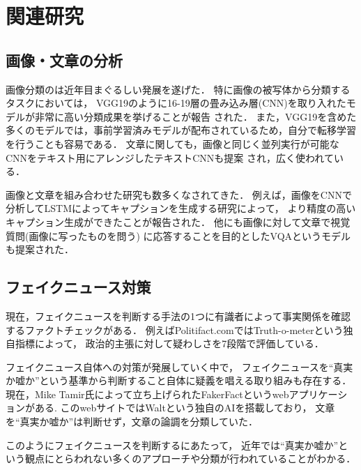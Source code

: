 \section{関連研究}
\subsection{画像・文章の分析}
画像分類のは近年目まぐるしい発展を遂げた．
特に画像の被写体から分類するタスクにおいては，
VGG19のように16-19層の畳み込み層(CNN)を取り入れたモデルが非常に高い分類成果を挙げることが報告
\cite{DBLP:journals/corr/SimonyanZ14a}された．
また，VGG19を含めた多くのモデルでは，事前学習済みモデルが配布されているため，自分で転移学習を行うことも容易である．
文章に関しても，画像と同じく並列実行が可能なCNNをテキスト用にアレンジしたテキストCNNも提案
\cite{DBLP:journals/corr/Kim14f}され，広く使われている．

画像と文章を組み合わせた研究も数多くなされてきた．
例えば，画像をCNNで分析してLSTMによってキャプションを生成する研究\cite{7298935}によって，
より精度の高いキャプション生成ができたことが報告された．
他にも画像に対して文章で視覚質問(画像に写ったものを問う)
に応答することを目的としたVQA\cite{7410636}というモデルも提案された．

\subsection{フェイクニュース対策}
現在，フェイクニュースを判断する手法の1つに有識者によって事実関係を確認するファクトチェックがある．
例えばPolitifact.comではTruth-o-meterという独自指標によって，
政治的主張に対して疑わしさを7段階で評価\cite{holan_2018}している．

フェイクニュース自体への対策が発展していく中で，
フェイクニュースを``真実か嘘か''という基準から判断すること自体に疑義を唱える取り組みも存在する．
現在，Mike Tamir氏によって立ち上げられたFakerFactというwebアプリケーションがある\cite{tamir}.
このwebサイトではWaltという独自のAIを搭載しており，
文章を``真実か嘘か''は判断せず，文章の論調を分類していた．

このようにフェイクニュースを判断するにあたって，
近年では``真実か嘘か''という観点にとらわれない多くのアプローチや分類が行われていることがわかる．
